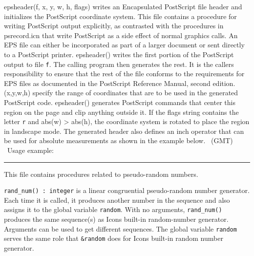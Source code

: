 \textsf{epsheader(f, x, y, w, h, flags)} writes an Encapsulated
PostScript file header and initializes the PostScript coordinate
system. This file contains a procedure for writing PostScript output
explicitly, as contrasted with the procedures in psrecord.icn that
write PostScript as a side effect of normal graphics calls. An EPS file
can either be incorporated as part of a larger document or sent
directly to a PostScript printer. \textsf{epsheader()} writes the first
portion of the PostScript output to file \texttt{f}. The calling
program then generates the rest. It is the caller{\textquotesingle}s
responsibility to ensure that the rest of the file conforms to the
requirements for EPS files as documented in the PostScript Reference
Manual, second edition. (x,y,w,h) specify the range of coordinates that
are to be used in the generated PostScript code. \textsf{epsheader()}
generates PostScript commands that center this region
on the page and clip anything outside it. If the flags string contains
the letter \texttt{{\textquotedbl}r{\textquotedbl}} and \textsf{abs(w)
{\textgreater} abs(h)}, the coordinate system is rotated to place the
region in {\textquotedbl}landscape{\textquotedbl} mode. The generated
header also defines an {\textquotedbl}inch{\textquotedbl} operator that
can be used for absolute measurements as shown in the example below.
\ (GMT) \ Usage example:


\vspace{0.25cm}\hrule{}

This file contains procedures related to pseudo-random numbers.

\texttt{rand\_num() : integer} is a linear congruential pseudo-random
number generator. Each time it is called, it produces
another number in the sequence and also assigns it to the global
variable \texttt{random}. With no arguments, \texttt{rand\_num()}
produces the same sequence(s) as Icon{\textquotesingle}s built-in
random-number generator. Arguments can
be used to get different sequences. The global variable \texttt{random}
serves the same role that \texttt{\&random} does for
Icon{\textquotesingle}s built-in random
number generator.

